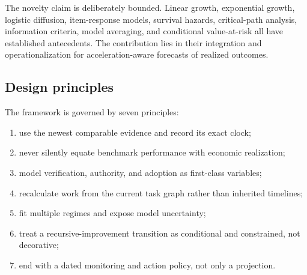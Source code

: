 The novelty claim is deliberately bounded. Linear growth, exponential growth, logistic diffusion, item-response models, survival hazards, critical-path analysis, information criteria, model averaging, and conditional value-at-risk all have established antecedents. The contribution lies in their integration and operationalization for acceleration-aware forecasts of realized outcomes.

\subsection{Design principles}

The framework is governed by seven principles:

\begin{enumerate}
\item use the newest comparable evidence and record its exact clock;
\item never silently equate benchmark performance with economic realization;
\item model verification, authority, and adoption as first-class variables;
\item recalculate work from the current task graph rather than inherited timelines;
\item fit multiple regimes and expose model uncertainty;
\item treat a recursive-improvement transition as conditional and constrained, not decorative;
\item end with a dated monitoring and action policy, not only a projection.
\end{enumerate}
